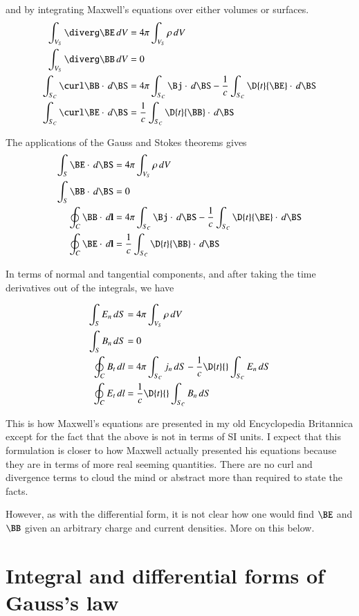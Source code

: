 \documentclass{article}      %
\begin{document}
and by integrating Maxwell's equations over either volumes or surfaces.
\begin{align*}
\int_{V_S} \diverg \BE \, dV &= 4\pi \int_{V_S} \rho\, dV \\
\int_{V_S} \diverg \BB \, dV &= 0 \\
\int_{S_C} \curl \BB \cdot \, d\BS &= 4\pi \int_{S_C} \Bj \cdot \, d\BS - \frac{1}{c} \int_{S_C} \D{t}{\BE} \cdot \, d\BS \\
\int_{S_C} \curl \BE \cdot \, d\BS &= \frac{1}{c} \int_{S_C} \D{t}{\BB} \cdot \, d\BS
\end{align*}

The applications of the Gauss and Stokes theorems gives
\begin{align*}
\int_{S} \BE \cdot \, d\BS &= 4\pi \int_{V_S} \rho\, dV \\
\int_{S} \BB \cdot \, d\BS &= 0 \\
\oint_{C} \BB \cdot \, d\mathbf{l} &= 4\pi \int_{S_C} \Bj \cdot \, d\BS - \frac{1}{c} \int_{S_C} \D{t}{\BE} \cdot \, d\BS \\
\oint_{C} \BE \cdot \, d\mathbf{l} &= \frac{1}{c} \int_{S_C} \D{t}{\BB} \cdot \, d\BS
\end{align*}

In terms of normal and tangential components, and after taking the time 
derivatives out of the integrals, we have

\begin{align*}
\int_{S} E_n \, dS &= 4\pi \int_{V_S} \rho\, dV \\
\int_{S} B_n \, dS &= 0 \\
\oint_{C} B_t \, dl &= 4\pi \int_{S_C} j_n \, dS - \frac{1}{c} \D{t}{} \int_{S_C} E_n \, dS \\
\oint_{C} E_t \, dl &= \frac{1}{c} \D{t}{} \int_{S_C} B_n \, dS
\end{align*}

This is how 
Maxwell's equations are presented in my old 
Encyclopedia Britannica 
except for the fact that 
the above is not in terms of SI units.  I expect that this formulation is closer to how 
Maxwell actually presented his equations because they are in terms of more real 
seeming quantities.  There are no curl and divergence terms to cloud the mind or
abstract more than required to state the facts.

However, as with the differential form, it is not clear how one would find
$\BE$ and $\BB$ given an arbitrary charge and current densities.  More on 
this below.

\section{Integral and differential forms of Gauss's law}
\end{document}
